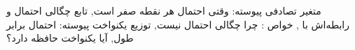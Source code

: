 \documentclass[a4paper,11pt,oneside,openany]{book}
\begin{document}
  {{متغیر تصادفی پیوسته: وقتی احتمال هر نقطه صفر است},
   {تابع چگالی احتمال  و رابطه‌اش با },
   {خواص : چرا چگالی احتمال نیست},
   {توزیع یکنواخت پیوسته: احتمال برابر طول},
   {آیا یکنواخت حافظه دارد؟}}

\mainmatter
\setcounter{chapter}{6}   %

\end{document}
